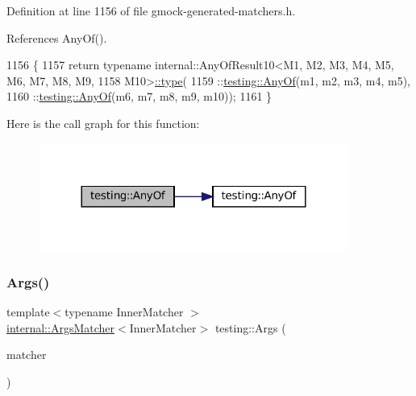 Definition at line 1156 of file gmock-\/generated-\/matchers.\+h.



References Any\+Of().


\begin{DoxyCode}
1156                                                                               \{
1157   \textcolor{keywordflow}{return} \textcolor{keyword}{typename} internal::AnyOfResult10<M1, M2, M3, M4, M5, M6, M7, M8, M9,
1158       M10>\hyperlink{namespacegenerate__debs_a50bc9a7ecac9584553e089a448bcde58}{::type}(
1159       ::\hyperlink{namespacetesting_a81cfefd9f75cdce827d5bc873cf73aac}{testing::AnyOf}(m1, m2, m3, m4, m5),
1160       ::\hyperlink{namespacetesting_a81cfefd9f75cdce827d5bc873cf73aac}{testing::AnyOf}(m6, m7, m8, m9, m10));
1161 \}
\end{DoxyCode}
Here is the call graph for this function\+:
\nopagebreak
\begin{figure}[H]
\begin{center}
\leavevmode
\includegraphics[width=288pt]{namespacetesting_a1797921d3ed04c7f13dfa8f36bf0bf1c_cgraph}
\end{center}
\end{figure}
\mbox{\label{namespacetesting_aaca153f67b689b8b9d5b8c67ecf8cee4}} 
\subsubsection{\texorpdfstring{Args()}{Args()}\hspace{0.1cm}{\footnotesize\ttfamily [1/11]}}
{\footnotesize\ttfamily template$<$typename Inner\+Matcher $>$ \\
\hyperlink{classtesting_1_1internal_1_1ArgsMatcher}{internal\+::\+Args\+Matcher}$<$Inner\+Matcher$>$ testing\+::\+Args (\begin{DoxyParamCaption}\item[{const Inner\+Matcher \&}]{matcher }\end{DoxyParamCaption})\hspace{0.3cm}{\ttfamily [inline]}}



